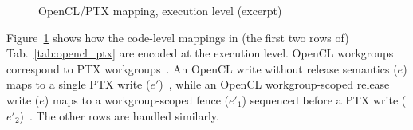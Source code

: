 \begin{figure}[t]

\caption{OpenCL/PTX mapping, execution level (excerpt)}
\label{fig:compile_opencl_ptx}
\end{figure}

Figure~\ref{fig:compile_opencl_ptx} shows how the code-level mappings
in (the first two rows of) Tab.~\ref{tab:opencl_ptx} are encoded at
the execution level. OpenCL workgroups correspond to PTX
workgroups~. An OpenCL write without release
semantics ($e$) maps to a single PTX write
($e'$)~, while an OpenCL workgroup-scoped
release write ($e$) maps to a workgroup-scoped fence ($e'_1$)
sequenced before a PTX write ($e'_2$)~. The
other rows are handled similarly.

